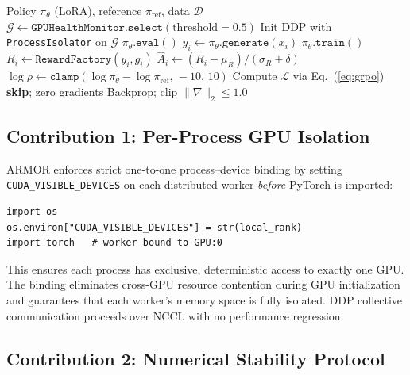 \documentclass{ieeeaccess}
\begin{document}
\begin{algorithm}[t]
\caption{ARMOR GRPO Training with Defense-in-Depth}
\label{alg:armor}
\begin{algorithmic}[1]
\REQUIRE Policy $\pi_\theta$ (LoRA), reference $\pi_{\mathrm{ref}}$, data $\mathcal{D}$
\STATE $\mathcal{G} \leftarrow \texttt{GPUHealthMonitor.select}(\mathrm{threshold}=0.5)$
\STATE Init DDP with \texttt{ProcessIsolator} on $\mathcal{G}$
    \STATE $\pi_\theta.\texttt{eval}()$ 
    \STATE $y_i \leftarrow \pi_\theta.\texttt{generate}(x_i)$
    \STATE $\pi_\theta.\texttt{train}()$
    \STATE $R_i \leftarrow \texttt{RewardFactory}(y_i,g_i)$ 
    \STATE $\hat{A}_i \leftarrow (R_i{-}\mu_R)/(\sigma_R{+}\delta)$
    \STATE $\log\rho \leftarrow \texttt{clamp}(\log\pi_\theta{-}\log\pi_{\mathrm{ref}},\,-10,\,10)$
    \STATE Compute $\mathcal{L}$ via Eq.~(\ref{eq:grpo})
      \STATE \textbf{skip}; zero gradients
    \ELSE
      \STATE Backprop; clip $\|\nabla\|_2 \leq 1.0$
    \ENDIF
  \ENDFOR
\ENDFOR
\end{algorithmic}
\end{algorithm}

\subsection{Contribution 1: Per-Process GPU Isolation}
\label{sec:isolation}

ARMOR enforces strict one-to-one process--device binding by setting
\texttt{CUDA\_VISIBLE\_DEVICES} on each distributed worker
\textit{before} PyTorch is imported:

\begin{lstlisting}[caption={ProcessIsolator preamble},label=lst:isolate]
import os
os.environ["CUDA_VISIBLE_DEVICES"] = str(local_rank)
import torch   # worker bound to GPU:0
\end{lstlisting}

This ensures each process has exclusive, deterministic access to exactly one GPU.
The binding eliminates cross-GPU resource contention during GPU initialization
and guarantees that each worker's memory space is fully isolated.
DDP collective communication proceeds over NCCL with no performance regression.


\subsection{Contribution 2: Numerical Stability Protocol}
\label{sec:stability}
\end{document}
